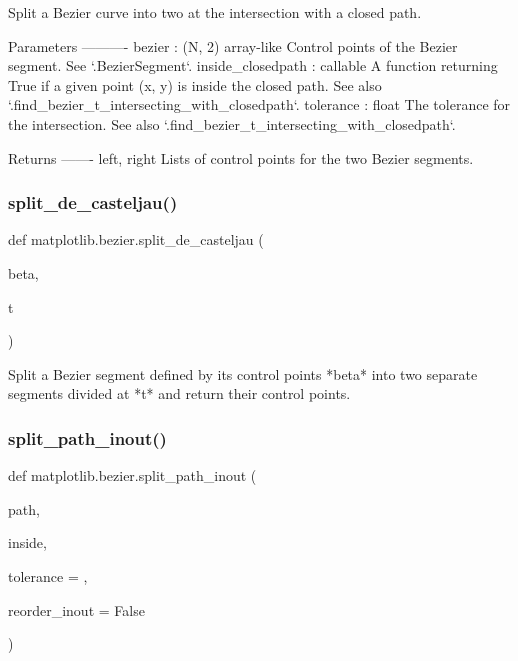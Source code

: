 \begin{DoxyVerb}Split a Bezier curve into two at the intersection with a closed path.

Parameters
----------
bezier : (N, 2) array-like
    Control points of the Bezier segment. See `.BezierSegment`.
inside_closedpath : callable
    A function returning True if a given point (x, y) is inside the
    closed path. See also `.find_bezier_t_intersecting_with_closedpath`.
tolerance : float
    The tolerance for the intersection. See also
    `.find_bezier_t_intersecting_with_closedpath`.

Returns
-------
left, right
    Lists of control points for the two Bezier segments.
\end{DoxyVerb}
 \mbox{\label{namespacematplotlib_1_1bezier_a39eaa29c167901ce43a1e03ff3397d36}} 
\subsubsection{\texorpdfstring{split\+\_\+de\+\_\+casteljau()}{split\_de\_casteljau()}}
{\footnotesize\ttfamily def matplotlib.\+bezier.\+split\+\_\+de\+\_\+casteljau (\begin{DoxyParamCaption}\item[{}]{beta,  }\item[{}]{t }\end{DoxyParamCaption})}

\begin{DoxyVerb}Split a Bezier segment defined by its control points *beta* into two
separate segments divided at *t* and return their control points.
\end{DoxyVerb}
 \mbox{\label{namespacematplotlib_1_1bezier_aa1e31992c932224101ec7a160cd79c3b}} 
\subsubsection{\texorpdfstring{split\+\_\+path\+\_\+inout()}{split\_path\_inout()}}
{\footnotesize\ttfamily def matplotlib.\+bezier.\+split\+\_\+path\+\_\+inout (\begin{DoxyParamCaption}\item[{}]{path,  }\item[{}]{inside,  }\item[{}]{tolerance = {},  }\item[{}]{reorder\+\_\+inout = {\ttfamily False} }\end{DoxyParamCaption})}

